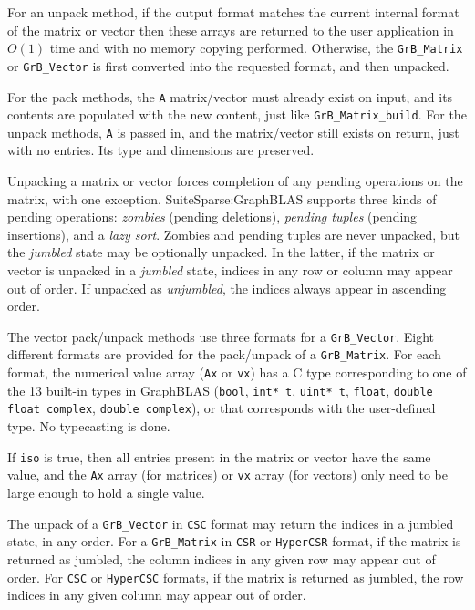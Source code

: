 \documentclass[12pt]{article}
\begin{document}
For an unpack method, if the output format matches the current internal format of the
matrix or vector then these arrays are returned to the user application in
$O(1)$ time and with no memory copying performed.  Otherwise, the
\verb'GrB_Matrix' or \verb'GrB_Vector' is first converted into the requested
format, and then unpacked.

For the pack methods, the \verb'A' matrix/vector must already exist on input, and its contents are
populated with the new content, just like \verb'GrB_Matrix_build'.
For the unpack
methods, \verb'A' is passed in, and the matrix/vector still exists on return,
just with no entries.  Its type and dimensions are preserved.

Unpacking a matrix or vector forces completion of any pending
operations on the matrix, with one exception.  SuiteSparse:GraphBLAS supports
three kinds of pending operations: {\em zombies} (pending deletions), {\em
pending tuples} (pending insertions), and a {\em lazy sort}.  Zombies and
pending tuples are never unpacked, but the {\em jumbled} state may be
optionally unpacked.  In the latter, if the matrix or vector is unpacked in a
{\em jumbled} state, indices in any row or column may appear out of order.  If
unpacked as {\em unjumbled}, the indices always appear in ascending order.

The vector pack/unpack methods use three formats for a
\verb'GrB_Vector'.  Eight different formats are provided for the
pack/unpack of a \verb'GrB_Matrix'.  For each format, the
numerical value array (\verb'Ax' or \verb'vx') has a C type corresponding to
one of the 13 built-in types in GraphBLAS (\verb'bool', \verb'int*_t',
\verb'uint*_t', \verb'float', \verb'double' \verb'float complex', \verb'double complex'),
or that corresponds with the user-defined type.  No typecasting is
done.

If \verb'iso' is true, then all entries present in the matrix or vector
have the same value, and the \verb'Ax' array (for matrices) or \verb'vx' array
(for vectors) only need to be large enough to hold a single value.

The unpack of a \verb'GrB_Vector' in \verb'CSC' format may return the
indices in a jumbled state, in any order.
For a \verb'GrB_Matrix' in \verb'CSR' or \verb'HyperCSR' format, if the matrix
is returned as jumbled, the column indices in any given row may appear out of
order.  For \verb'CSC' or \verb'HyperCSC' formats, if the matrix is returned as
jumbled, the row indices in any given column may appear out of order.
\end{document}

